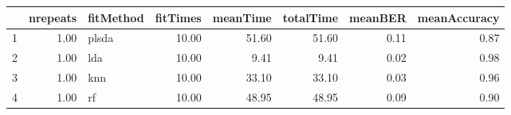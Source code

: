 \begin{table}[ht]
\centering
\begin{tabular}{rrlrrrrr}
  \hline
 & nrepeats & fitMethod & fitTimes & meanTime & totalTime & meanBER & meanAccuracy \\ 
  \hline
1 & 1.00 & plsda & 10.00 & 51.60 & 51.60 & 0.11 & 0.87 \\ 
  2 & 1.00 & lda & 10.00 & 9.41 & 9.41 & 0.02 & 0.98 \\ 
  3 & 1.00 & knn & 10.00 & 33.10 & 33.10 & 0.03 & 0.96 \\ 
  4 & 1.00 & rf & 10.00 & 48.95 & 48.95 & 0.09 & 0.90 \\ 
   \hline
\end{tabular}
\end{table}
